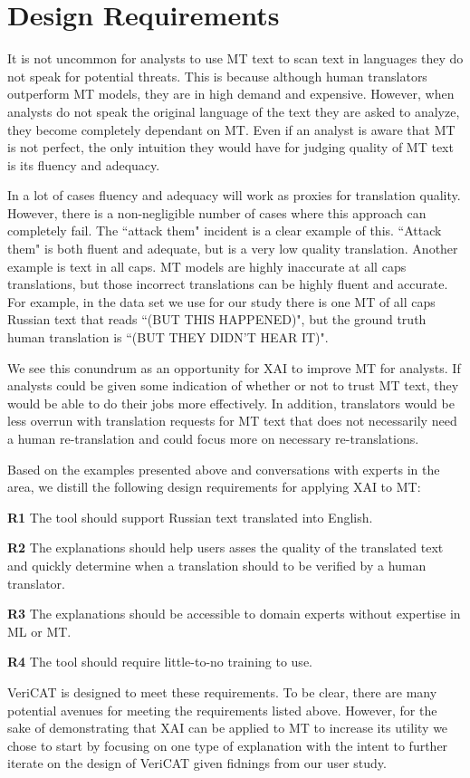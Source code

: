 \section{Design Requirements}
\label{sec:design_requirements}

It is not uncommon for analysts to use MT text to scan text in languages they do not speak for potential threats. This is because although human translators outperform MT models, they are in high demand and expensive\cite{mauvcec2019machine}. However, when analysts do not speak the original language of the text they are asked to analyze, they become completely dependant on MT. Even if an analyst is aware that MT is not perfect, the only intuition they would have for judging quality of MT text is its fluency and adequacy. 

In a lot of cases fluency and adequacy will work as proxies for translation quality. However, there is a non-negligible number of cases where this approach can completely fail. The ``attack them" incident is a clear example of this. ``Attack them" is both fluent and adequate, but is a very low quality translation. Another example is text in all caps. MT models are highly inaccurate at all caps translations, but those incorrect translations can be highly fluent and accurate. For example, in the data set we use for our study there is one MT of all caps Russian text that reads ``(BUT THIS HAPPENED)", but the ground truth human translation is ``(BUT THEY DIDN'T HEAR IT)".       

We see this conundrum as an opportunity for XAI to improve MT for analysts. If analysts could be given some indication of whether or not to trust MT text, they would be able to do their jobs more effectively. In addition, translators would be less overrun with translation requests for MT text that does not necessarily need a human re-translation and could focus more on necessary re-translations.

Based on the examples presented above and conversations with experts in the area, we distill the following design requirements for applying XAI to MT: 

\begin{compacthang}
\item \textbf{R1} The tool should support Russian text translated into English. 
\item \textbf{R2} The explanations should help users asses the quality of the translated text and quickly determine when a translation should to be verified by a human translator.
\item \textbf{R3} The explanations should be accessible to domain experts without expertise in ML or MT.
\item \textbf{R4} The tool should require little-to-no training to use.
\end{compacthang}

VeriCAT is designed to meet these requirements. To be clear, there are many potential avenues for meeting the requirements listed above. However, for the sake of demonstrating that XAI can be applied to MT to increase its utility we chose to start by focusing on one type of explanation with the intent to further iterate on the design of VeriCAT given fidnings from our user study.    